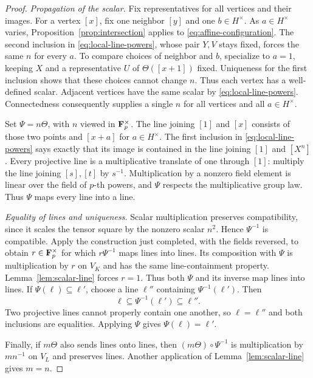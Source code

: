 \begin{proof}
\smallskip
\noindent\emph{Propagation of the scalar.}
Fix representatives for all vertices and their images.  For a vertex
$[x]$, fix one neighbor $[y]$ and one $b\in H^\times$.  As
$a\in H^\times$ varies, Proposition~\ref{prop:intersection} applies
to \eqref{eq:affine-configuration}.  The second inclusion in
\eqref{eq:local-line-powers}, whose pair $Y,V$ stays fixed, forces
the same $n$ for every $a$.  To compare choices of neighbor and $b$,
specialize to $a=1$, keeping $X$ and a representative $U$ of
$\Theta([x+1])$ fixed.  Uniqueness for the first inclusion shows that
these choices cannot change $n$.  Thus each vertex has a
well-defined scalar.  Adjacent vertices have the same scalar by
\eqref{eq:local-line-powers}.  Connectedness consequently supplies a
single $n$ for all vertices and all $a\in H^\times$.

Set $\Psi=n\Theta$, with $n$ viewed in $\mathbf F_p^\times$.
The line joining $[1]$ and $[x]$ consists of those two points and
$[x+a]$ for $a\in H^\times$.  The first inclusion in
\eqref{eq:local-line-powers} says exactly that its image is contained
in the line joining $[1]$ and $[X^n]$.  Every projective line is a
multiplicative translate of one through $[1]$: multiply the line
joining $[s],[t]$ by $s^{-1}$.  Multiplication by a nonzero field
element is linear over the field of $p$-th powers, and $\Psi$ respects
the multiplicative group law.  Thus $\Psi$ maps every line into a line.

\smallskip
\noindent\emph{Equality of lines and uniqueness.}
Scalar multiplication preserves compatibility, since it scales the
tensor square by the nonzero scalar $n^2$.  Hence $\Psi^{-1}$ is
compatible.  Apply the construction just completed, with the fields
reversed, to obtain $r\in\mathbf F_p^\times$ for which $r\Psi^{-1}$ maps
lines into lines.  Its composition with $\Psi$ is multiplication
by $r$ on $V_K$ and has the same line-containment property.
Lemma~\ref{lem:scalar-line} forces $r=1$.
Thus both $\Psi$ and its inverse map lines into lines.  If
$\Psi(\ell)\subseteq\ell'$, choose a line $\ell''$ containing
$\Psi^{-1}(\ell')$.  Then
\[
 \ell\subseteq\Psi^{-1}(\ell')\subseteq\ell''.
\]
Two projective lines cannot properly contain one another, so
$\ell=\ell''$ and both inclusions are equalities.  Applying $\Psi$
gives $\Psi(\ell)=\ell'$.

Finally, if $m\Theta$ also sends lines onto lines, then
$(m\Theta)\circ\Psi^{-1}$ is multiplication by $mn^{-1}$ on
$V_L$ and preserves lines.  Another application of
Lemma~\ref{lem:scalar-line} gives $m=n$.
\end{proof}
